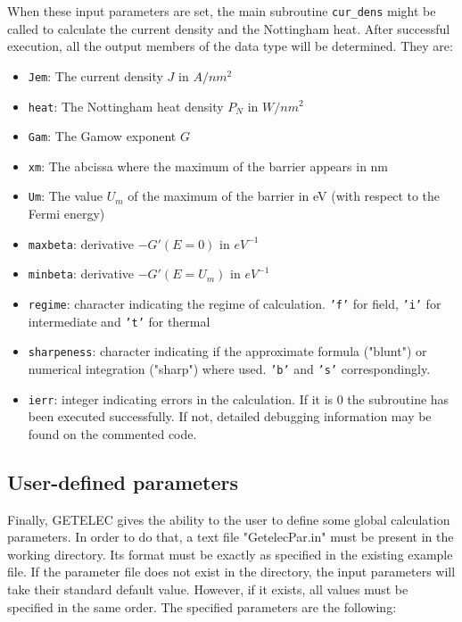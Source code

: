 \documentclass[notitlepage
]{revtex4-1}
\begin{document}
When these input parameters are set, the main subroutine \texttt{cur\_dens} might be called to calculate the current density and the Nottingham heat. After successful execution, all the output members of the data type will be determined. They are:
\begin{itemize}
	\item \texttt{Jem}: The current density $J$ in $A/nm^2$
	\item \texttt{heat}: The Nottingham heat density $P_N$ in $W/nm^2$
	\item \texttt{Gam}: The Gamow exponent $G$
	\item \texttt{xm}: The abcissa where the maximum of the barrier appears in nm
	\item \texttt{Um}: The value $U_m$ of the maximum of the barrier in eV (with respect to the Fermi energy)
	\item \texttt{maxbeta}: derivative $-G'( E = 0)$ in $eV^{-1}$
	\item \texttt{minbeta}: derivative $-G'( E = U_m)$ in $eV^{-1}$
	\item \texttt{regime}: character indicating the regime of calculation. \texttt{'f'} for field, \texttt{'i'} for intermediate and \texttt{'t'} for thermal
	\item \texttt{sharpeness}: character indicating if the approximate formula ("blunt") or numerical integration ("sharp") where used. \texttt{'b'} and \texttt{'s'} correspondingly.
	\item \texttt{ierr}: integer indicating errors in the calculation. If it is 0 the subroutine has been executed successfully. If not, detailed debugging information may be found on the commented code.    
\end{itemize}

\subsection{User-defined parameters}

Finally, GETELEC gives the ability to the user to define some global calculation parameters. In order to do that, a text file "GetelecPar.in" must be present in the working directory. Its format must be exactly as specified in the existing example file. If the parameter file does not exist in the directory, the input parameters will take their standard default value. However, if it exists, all values must be specified in the same order. The specified parameters are the following: 
\end{document}
